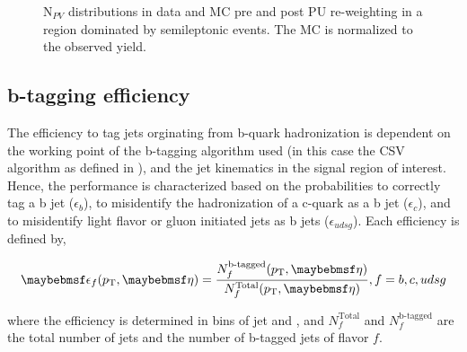 \begin{figure}
  \caption{$\text{N}_{PV}$ distributions in data and MC pre and post PU re-weighting in a region dominated by semileptonic \ttbar events. The MC is normalized to the observed yield.}
  \label{fig:npv}
\end{figure} 

\subsection{b-tagging efficiency}

The efficiency to tag jets orginating from b-quark hadronization is dependent on the working point of the b-tagging algorithm used (in this case the CSV algorithm as defined in ), and the jet kinematics in the signal region of interest. Hence, the performance is characterized based on the probabilities to correctly tag a b jet ($\epsilon_{b}$), to misidentify the hadronization of a c-quark as a b jet ($\epsilon_{c}$), and to misidentify light flavor or gluon initiated jets as b jets ($\epsilon_{udsg}$). Each efficiency is defined by,

\begin{equation}
  \epsilon_{f}(\pt,\eta) = \frac{N_{f}^{\text{b-tagged}}(\pt,\eta)}{N_{f}^{\text{Total}}(\pt,\eta)}, f=b,c,udsg
\end{equation}

where the efficiency is determined in bins of jet \pt and \eta, and $N_{f}^{\text{Total}}$ and $N_{f}^{\textrm{b-tagged}}$ are the total number of jets and the number of b-tagged jets of flavor $f$. 

